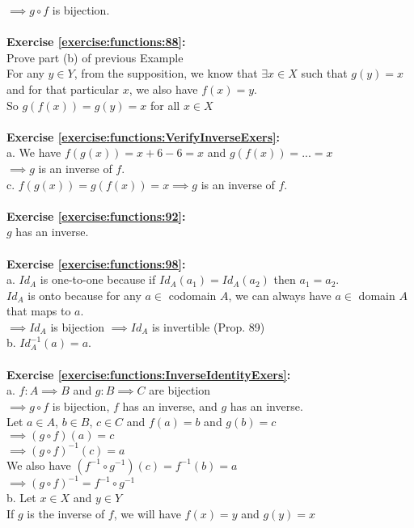 $\implies g\circ f$ is bijection.\\
\\
\textbf{Exercise \ref{exercise:functions:88}:}\\
Prove part (b) of previous Example\\
For any $y\in Y$, from the supposition, we know that $\exists x\in X$ such that $g(y)=x$ and for that particular $x$, we also have $f(x)=y$.\\
So $g(f(x))=g(y)=x$ for all $x\in X$\\
\\
\textbf{Exercise \ref{exercise:functions:VerifyInverseExers}:}\\
a. We have $f(g(x))=x+6-6=x$ and $g(f(x))=...=x$\\
$\implies g$ is an inverse of $f$.\\
c. $f(g(x))=g(f(x))=x \implies g$ is an inverse of $f$.\\
\\
\textbf{Exercise \ref{exercise:functions:92}:}\\
$g$ has an inverse.\\
\\
\textbf{Exercise \ref{exercise:functions:98}:}\\
a. $Id_A$ is one-to-one because if $Id_A(a_1)=Id_A(a_2)$ then $a_1=a_2$.\\
$Id_A$ is onto because for any $a\in$ codomain $A$, we can always have $a\in$ domain $A$ that maps to $a$.\\
$\implies Id_A$ is bijection $\implies Id_A$ is invertible (Prop. 89)\\
b. $Id_A^{-1}(a)=a$.\\
\\
\textbf{Exercise \ref{exercise:functions:InverseIdentityExers}:}\\
a. $f: A\implies B$ and $g: B\implies C$ are bijection\\
$\implies g\circ f$ is bijection, $f$ has an inverse, and $g$ has an inverse.\\
Let $a\in A$, $b\in B$, $c\in C$ and $f(a)=b$ and $g(b)=c$\\
$\implies (g\circ f)(a)=c$\\
$\implies (g\circ f)^{-1}(c)=a$\\
We also have $(f^{-1}\circ g^{-1})(c)=f^{-1}(b)=a$\\
$\implies (g\circ f)^{-1}=f^{-1}\circ g^{-1}$\\
b. Let $x\in X$ and $y\in Y$\\
If $g$ is the inverse of $f$, we will have $f(x)=y$ and $g(y)=x$\\

